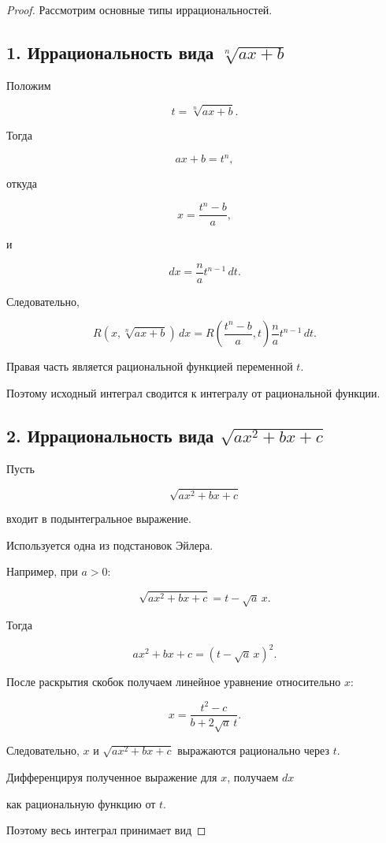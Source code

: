 \documentclass[14pt]{extreport}
\begin{document}
\begin{proof}

Рассмотрим основные типы иррациональностей.

\subsection*{1. Иррациональность вида $\sqrt[n]{ax+b}$}

Положим

\[
t=\sqrt[n]{ax+b}.
\]

Тогда

\[
ax+b=t^n,
\]

откуда

\[
x=\frac{t^n-b}{a},
\]

и

\[
dx=\frac{n}{a}t^{n-1}\,dt.
\]

Следовательно,

\[
R\!\left(x,\sqrt[n]{ax+b}\right)\,dx
=
R\!\left(
\frac{t^n-b}{a},
t
\right)
\frac{n}{a}t^{n-1}\,dt.
\]

Правая часть является рациональной функцией переменной $t$.

Поэтому исходный интеграл сводится к интегралу от рациональной функции.

\subsection*{2. Иррациональность вида $\sqrt{ax^2+bx+c}$}

Пусть

\[
\sqrt{ax^2+bx+c}
\]

входит в подынтегральное выражение.

Используется одна из подстановок Эйлера.

Например, при $a>0$:

\[
\sqrt{ax^2+bx+c}
=
t-\sqrt a\,x.
\]

Тогда

\[
ax^2+bx+c
=
(t-\sqrt a\,x)^2.
\]

После раскрытия скобок получаем линейное уравнение относительно $x$:

\[
x=
\frac{t^2-c}
     {b+2\sqrt a\,t}.
\]

Следовательно,
$
x
$
и
$
\sqrt{ax^2+bx+c}
$
выражаются рационально через $t$.

Дифференцируя полученное выражение для $x$,
получаем
$
dx
$

как рациональную функцию от $t$.

Поэтому весь интеграл принимает вид


\end{proof}
\end{document}
